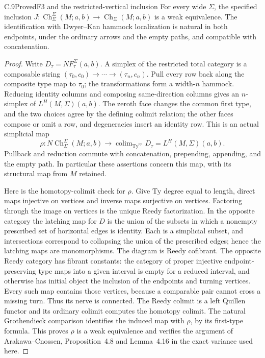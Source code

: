 \begin{claim}{C.9}{Proved}{F3 and the restricted-vertical inclusion}
For every wide $\Sigma$, the specified inclusion
$J:\operatorname{Ch}_\Sigma^\Sigma(M;a,b)\to
\operatorname{Ch}_\Sigma(M;a,b)$ is a weak equivalence.
The identification with Dwyer--Kan hammock localization is natural
in both endpoints, under the ordinary arrows and the empty paths,
and compatible with concatenation.
\end{claim}
\begin{proof}
Write $D_\tau=NF_\tau^\Sigma(a,b)$. A simplex of the restricted
total category is a composable string
$(\tau_0,c_0)\to\cdots\to(\tau_n,c_n)$. Pull every row back
along the composite type map to $\tau_0$; the transformations form
a width-$n$ hammock. Reducing identity columns and composing
same-direction columns gives an $n$-simplex of
$L^H(M,\Sigma)(a,b)$. The zeroth face changes the common first
type, and the two choices agree by the defining colimit relation;
the other faces compose or omit a row, and degeneracies insert an
identity row. This is an actual simplicial map
\[
 \rho:N\operatorname{Ch}_\Sigma^\Sigma(M;a,b)
 \longrightarrow\operatorname{colim}_{\mathrm{Ty}^{\mathrm{op}}}D_\tau
 =L^H(M,\Sigma)(a,b).
\]
Pullback and reduction commute with concatenation, prepending,
appending, and the empty path. In particular these assertions
concern this map, with its structural map from $M$ retained.

Here is the homotopy-colimit check for $\rho$. Give
$\mathrm{Ty}$ degree equal to length, direct maps injective on
vertices and inverse maps surjective on vertices. Factoring through
the image on vertices is the unique Reedy factorization. In the
opposite category the latching map for $D$ is the union of the
subsets in which a nonempty prescribed set of horizontal edges is
identity. Each is a simplicial subset, and intersections correspond
to collapsing the union of the prescribed edges; hence the
latching maps are monomorphisms. The diagram is Reedy cofibrant.
The opposite Reedy category has fibrant constants: the category
of proper injective endpoint-preserving type maps into a given
interval is empty for a reduced interval, and otherwise has initial
object the inclusion of the endpoints and turning vertices. Every
such map contains those vertices, because a comparable pair cannot
cross a missing turn. Thus its nerve is connected. The Reedy
colimit is a left Quillen functor and its ordinary colimit computes
the homotopy colimit. The natural Grothendieck comparison identifies
the induced map with $\rho$, by its first-type formula. This
proves $\rho$ is a weak equivalence and verifies the argument of
Arakawa--Cnossen, Proposition~4.8 and Lemma~4.16
\cite{CpathsArakawaCnossen} in the exact variance used here.


\end{proof}
